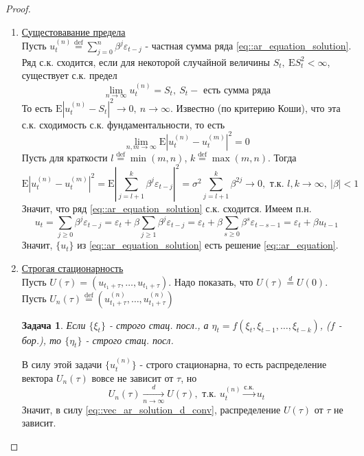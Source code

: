 \documentclass[12pt]{article}
\newtheorem*{task}{Задача}
\newcommand*{\defeq}{\stackrel{\text{def}}{=}}
\def\eps{ \varepsilon }
\def\E{ \mathrm{E} }
\begin{document}
\begin{proof}
    \begin{enumerate}
        \item \underline{Сущестовавание предела} \\
        Пусть $u_t^{(n)}\defeq\sum_{j=0}^n\beta^j\eps_{t-j}$ - частная сумма ряда \eqref{eq::ar_equation_solution}.
        Ряд с.к. сходится, если для некоторой случайной величины $S_t,\ \E S_t^2<\infty$, существует
        с.к. предел
        \[\lim_{n\rightarrow\infty}u_t^{(n)}=S_t,\ S_t-\text{ есть сумма ряда}\] 
        То есть $\E\left\lvert u_t^{(n)}-S_t\right\rvert ^2\rightarrow0,\ n\rightarrow\infty$. Известно (по критерию Коши),
        что эта с.к. сходимость с.к. фундаментальности, то есть 
        \[\lim_{n,m\rightarrow\infty}\E\left\lvert u_t^{(n)}-u_t^{(m)}\right\rvert ^2=0\]
        Пусть для краткости $l\defeq\min(m,n)$, $k\defeq\max(m,n)$. Тогда
        \[\E\left\lvert u_t^{(n)}-u_t^{(m)}\right\rvert ^2=\E\left\lvert \sum_{j=l+1}^k\beta^j\eps_{t-j}\right\rvert ^2=\sigma^2\sum_{j=l+1}^k\beta^{2j}\rightarrow0,\text{ т.к. }l,k\rightarrow\infty,\ \left\lvert \beta\right\rvert <1\]
        Значит, что ряд \eqref{eq::ar_equation_solution} с.к. сходится. Имеем п.н.
        \[u_t=\sum_{j\geq0}\beta^j\eps_{t-j}=\eps_t+\beta\sum_{j\geq1}\beta^j\eps_{t-j}=\eps_t+\beta\sum_{s\geq0}\beta^s\eps_{t-s-1}=\eps_t+\beta u_{t-1}\]
        Значит, $\{u_t\}$ из \eqref{eq::ar_equation_solution} есть решение \eqref{eq::ar_equation}.
        
        \item \underline{Строгая стационарность} \\
        Пусть $U(\tau)=(u_{t_1+\tau},\ldots,u_{t_1+\tau})$. Надо показать, что $U(\tau)\overset{d}{=}U(0)$. \\
        Пусть $U_n(\tau)\defeq(u^{(n)}_{t_1+\tau},\ldots,u^{(n)}_{t_1+\tau})$
        \begin{task}
            Если $\{\xi_t\}$ - строго стац. посл., а $\eta_t=f(\xi_t,\xi_{t-1},\ldots,\xi_{t-k})$, ($f$ - бор.),
            то $\{\eta_t\}$ - строго стац. посл.
        \end{task}
        В силу этой задачи $\{u_t^{(n)}\}$ - строго стационарна, то есть распределение вектора $U_n(\tau)$
        вовсе не зависит от $\tau$, но
        \begin{equation}\label{eq::vec_ar_solution_d_conv}
            U_n(\tau)\underset{n\rightarrow\infty}{\xrightarrow{d}}U(\tau),\text{ т.к. } u_t^{(n)}\xrightarrow{\text{с.к.}}u_t
        \end{equation}
        Значит, в силу \eqref{eq::vec_ar_solution_d_conv}, распределение $U(\tau)$ от $\tau$ не зависит.
        

\end{enumerate}
\end{proof}
\end{document}
